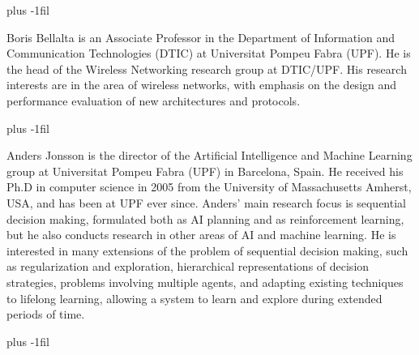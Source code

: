 \documentclass[10pt,journal,compsoc]{IEEEtran}
\begin{document}
	\vskip -20pt plus -1fil
	\begin{IEEEbiography}{Boris Bellalta} is an Associate Professor in the Department of Information and Communication Technologies (DTIC) at Universitat Pompeu Fabra (UPF). He is the head of the Wireless Networking research group at DTIC/UPF. His research interests are in the area of wireless networks, with emphasis on the design and performance evaluation of new architectures and protocols.
	\end{IEEEbiography}
	\vskip -20pt plus -1fil
	\begin{IEEEbiography}{Anders Jonsson} is the director of the Artificial Intelligence and Machine Learning group at Universitat Pompeu Fabra (UPF) in Barcelona, Spain. He received his Ph.D in computer science in 2005 from the University of Massachusetts Amherst, USA, and has been at UPF ever since. Anders' main research focus is sequential decision making, formulated both as AI planning and as reinforcement learning, but he also conducts research in other areas of AI and machine learning. He is interested in many extensions of the problem of sequential decision making, such as regularization and exploration, hierarchical representations of decision strategies, problems involving multiple agents, and adapting existing techniques to lifelong learning, allowing a system to learn and explore during extended periods of time.
	\end{IEEEbiography}
	\vskip -20pt plus -1fil
\end{document}
